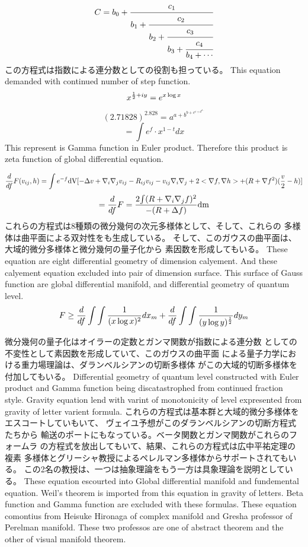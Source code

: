\documentclass{jsarticle}
\begin{document}
  $$ C =  b_0 + \cfrac{c_1}{b_1 +
	  \cfrac{c_2}{b_2 +
	  \cfrac{c_3}{b_3 +
	  \cfrac{c_4}{b_4 + \cdots}}}} $$
  この方程式は指数による連分数としての役割も担っている。  
  This equation demanded with continued number of step function.
  $$ x^{{1 \over 2} + iy} = e^{x \log x} $$
  $$ (2.71828)^{2.828} = a^{a + b^{b + c^{c + d^{d \cdots }}}} $$
  $$ = \int e^f \cdot x^{1 - t}dx $$
  This represent is Gamma function in Euler product.
  Therefore this product is zeta function of global differential equation.

  $$ {d \over d f}F(v_{ij},h) = \int {e^{-f}\mathrm{dV}}
  [- \Delta v + \nabla_{i}\nabla_{j}
  v_{ij} - R_{ij}v_{ij} - v_{ij}\nabla_{i}\nabla_{j} + 2 <\nabla f,\nabla h>
  + (R + \nabla f^2)({v \over 2} - h)]$$
  $$ = {d \over d f}F = {2 {\int (R + \nabla_{i}\nabla_{j} f)^2} \over 
  { - (R + \Delta f)}}\mathrm{dm} $$
  これらの方程式は8種類の微分幾何の次元多様体として、そして、これらの
  多様体は曲平面による双対性をも生成している。 
  そして、このガウスの曲平面は、大域的微分多様体と微分幾何の量子化から
  素因数を形成してもいる。
  These equation are eight differential geometry of dimension calyement.
  And these calyement equation excluded into pair of dimension surface.
  This surface of Gauss function are global differential manifold,
  and differential geometry of quantum level.
  $$ F \ge {d \over d f}\int \int{1 \over (x \log x)^2}dx_m 
  + {d \over d f}\int \int{1 \over (y \log y)^{1 \over 2}}dy_m $$

  微分幾何の量子化はオイラーの定数とガンマ関数が指数による連分数
  としての不変性として素因数を形成していて、このガウスの曲平面
  による量子力学における重力場理論は、ダランベルシアンの切断多様体
  がこの大域的切断多様体を付加してもいる。
  Differential geometry of quantum level constructed with Euler product
  and Gamma function being discatastrophed from continued fraction style.
  Gravity equation lend with varint of monotonicity of level expresented
  from gravity of letter varient formula.
  これらの方程式は基本群と大域的微分多様体をエスコートしていもいて、
  ヴェイユ予想がこのダランベルシアンの切断方程式たちから
  輸送のポートにもなっている。ベータ関数とガンマ関数がこれらのフォームラ
  の方程式を放出してもいて、結果、これらの方程式は広中平祐定理の複素
  多様体とグリーシャ教授によるペレルマン多様体からサポートされてもいる。
  この2名の教授は、一つは抽象理論をもう一方は具象理論を説明としている。
  These equation escourted into Global differential manifold and
  fundemental equation.
  Weil's theorem is imported from this equation in gravity of letters.
  Beta function and Gamma function are excluded with these formulas.
  These equation comontius from Heisuke Hironaga of complex manifold
  and Gresha professor of Perelman manifold.
  These two professos are one of abstract theorem and the other of
  visual manifold theorem.
\end{document}
